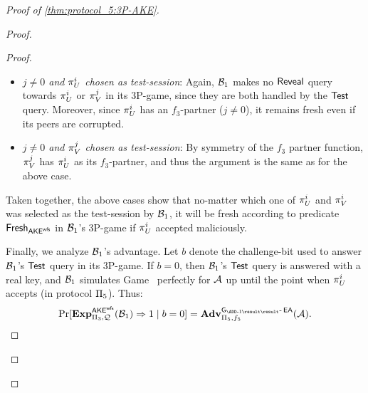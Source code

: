 \begin{proof}[Proof of \cref{thm:protocol_5:3P-AKE}]
\begin{proof}
\begin{proof}
\begin{itemize}
	


	\item \emph{$j \neq 0$ and $\oracle[U][i]$ chosen as test-session}:  
	Again, $\A[B]_1$ makes no $\Reveal$ query towards $\oracle[U][i]$ or $\oracle[V][j]$ in its 3P-\akewfstext game,
	since they are both handled by the $\Test$ query.
	Moreover,
	since $\oracle[U][i]$ has an $f_3$-partner ($j \neq 0$),
	it remains \akewfstext  fresh even if its peers are corrupted.
	

	
	
	\item \emph{$j \neq 0$ and $\oracle[V][j]$ chosen as test-session}:
	By symmetry of the $f_3$ partner function,
	$\oracle[V][j]$ has $\oracle[U][i]$ as its $f_3$-partner,
	and thus the argument is the same as for the above case.
%
%


\end{itemize}

Taken together,
the above cases show that no-matter which one of $\oracle[U][i]$ and $\oracle[V][i]$ was selected as the test-session by $\A[B]_1$,
it will be fresh according to predicate $\fresh_{\akewfs}$ in $\A[B]_1$'s 3P-\akewfstext game if $\oracle[U][i]$ accepted maliciously.

\medskip

Finally,
we analyze $\A[B]_1$'s advantage.
Let $b$ denote the challenge-bit used to answer $\A[B]_1$'s $\Test$ query in its 3P-\akewfstext game.
If $b=0$,
then $\A[B]_1$'s $\Test$ query is answered with a real key,
and $\A[B]_1$ simulates Game~\prevgame{} perfectly for $\A$ up until the point when $\oracle[U][i]$ accepts (in protocol $\protocol_5$).
Thus: 
\begin{align}\label{eq:proof:p5:EA:swap_keys_p3:MA_b=0}
	\Pr[\Exp_{\protocol_3,\queryset}^{\akewfs}(\A[B]_1) \Rightarrow 1 \mid b = 0] = \adv_{\protocol_5,f_5}^{\operatorname{\mathsf{G_{\prevgame}-\EA}}}(\A) .
\end{align}



\end{proof}
\end{proof}
\end{proof}
